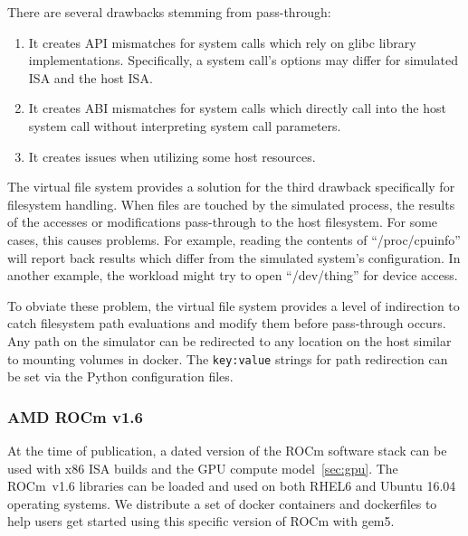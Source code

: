 There are several drawbacks stemming from pass-through:
\begin{enumerate}
    \item It creates API mismatches for system calls which rely on glibc library implementations. Specifically, a system call's options may differ for simulated ISA and the host ISA.
    \item It creates ABI mismatches for system calls which directly call into the host system call without interpreting system call parameters.
    \item It creates issues when utilizing some host resources.
\end{enumerate}

The virtual file system provides a solution for the third drawback specifically for filesystem handling.
When files are touched by the simulated process, the results of the accesses or modifications pass-through to the host filesystem.
For some cases, this causes problems.
For example, reading the contents of ``/proc/cpuinfo'' will report back results which differ from the simulated system's configuration.
In another example, the workload might try to open ``/dev/thing'' for device access.

To obviate these problem, the virtual file system provides a level of indirection to catch filesystem path evaluations and modify them before pass-through occurs.
Any path on the simulator can be redirected to any location on the host similar to mounting volumes in docker.
The \verb|key:value| strings for path redirection can be set via the Python configuration files.

\subsubsection{AMD ROCm v1.6}

At the time of publication, a dated version of the ROCm software stack can be used with x86 ISA builds and the GPU compute model~\ref{sec:gpu}.
The ROCm~v1.6 libraries can be loaded and used on both RHEL6 and Ubuntu 16.04 operating systems.
We distribute a set of docker containers and dockerfiles to help users get started using this specific version of ROCm with gem5.
